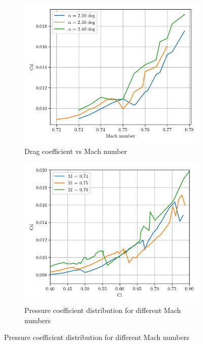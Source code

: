\documentclass[11pt]{article}
\begin{document}
\begin{figure}
    \centering
    \begin{subfigure}[t]{0.45\textwidth}
        \centering
        \includegraphics[width=\textwidth]{figures/cd_vs_mach.png}
        \caption{Drag coefficient vs Mach number}
        \label{fig:cd_vs_mach}
    \end{subfigure}
    \begin{subfigure}[t]{0.45\textwidth}
        \centering
        \includegraphics[width=\textwidth]{figures/cd_vs_cl.png}
        \caption{Pressure coefficient distribution for different Mach numbers}
        \label{fig:cd_vs_cl}
    \end{subfigure}
\end{figure}
\end{document}
